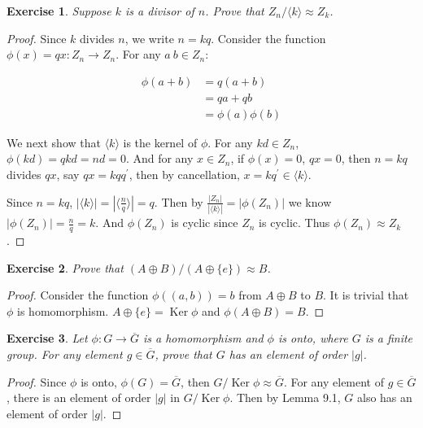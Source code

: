 \documentclass[14pt]{extarticle}
\newtheorem{exercise}{Exercise}[section]
\newcommand{\1}{\{ e \}}
\DeclareMathOperator{\Ker}{Ker}
\begin{document}
\begin{exercise}
  \label{exc:10.12}
  Suppose $k$ is a divisor of $n$. Prove that $Z_n / \langle k \rangle \approx Z_k$.
\end{exercise}
\begin{proof}
  Since $k$ divides $n$, we write $n = kq$.
  Consider the function $\phi(x) = qx : Z_n \rightarrow Z_n$.
  For any $a \ b \in Z_n$:

  \begin{align*}
    \phi(a + b) &= q(a + b) \\
    &= qa + qb \\
    &= \phi(a) \phi(b)
  \end{align*}

  We next show that $\langle k \rangle$ is the kernel of $\phi$.
  For any $kd \in Z_n$, $\phi(kd) = qkd = nd = 0$.
  And for any $x \in Z_n$, if $\phi(x) = 0$, $qx = 0$, 
  then $n = kq$ divides $qx$, say $qx = kqq^\prime$, 
  then by cancellation, $x = kq^\prime \in \langle k \rangle$.

  Since $n = kq$, $|\langle k \rangle| = |\langle \frac{n}{q} \rangle| = q$.
  Then by $\displaystyle \frac{|Z_n|}{|\langle k \rangle|} = |\phi(Z_n)|$
  we know $|\phi(Z_n)| = \frac{n}{q} = k$.
  And $\phi(Z_n)$ is cyclic since $Z_n$ is cyclic.
  Thus $\phi(Z_n) \approx Z_k$.
\end{proof}

\begin{exercise}
  Prove that $(A \oplus B)/(A \oplus \1) \approx B$.
\end{exercise}
\begin{proof}
  Consider the function $\phi((a , b)) = b$ from $A \oplus B$ to $B$.
  It is trivial that $\phi$ is homomorphism.
  $A \oplus \1 = \Ker \phi$ and
  $\phi(A \oplus B) = B$.
\end{proof}

\setcounter{exercise}{21}
\begin{exercise}
  Let $\phi : G \rightarrow \overline{G}$ is a homomorphism and $\phi$ is onto,
  where $G$ is a finite group.
  For any element $g \in \overline{G}$, prove that $G$ has an element of order $|g|$.
\end{exercise}
\begin{proof}
  Since $\phi$ is onto, $\phi(G) = \overline{G}$,
  then $G / \Ker \phi \approx \overline{G}$.
  For any element of $g \in \overline{G}$,
  there is an element of order $|g|$ in $G / \Ker \phi$.
  Then by Lemma 9.1, $G$ also has an element of order $|g|$.
\end{proof}
\end{document}
